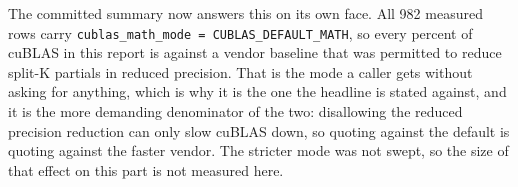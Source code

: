 The committed summary now answers this on its own face. All 982 measured rows carry
\texttt{cublas\_math\_mode = CUBLAS\_DEFAULT\_MATH}, so every percent of cuBLAS in
this report is against a vendor baseline that was permitted to reduce split-K
partials in reduced precision. That is the mode a caller gets without asking for
anything, which is why it is the one the headline is stated against, and it is the
more demanding denominator of the two: disallowing the reduced precision reduction
can only slow cuBLAS down, so quoting against the default is quoting against the
faster vendor. The stricter mode was not swept, so the size of that effect on this
part is not measured here.
